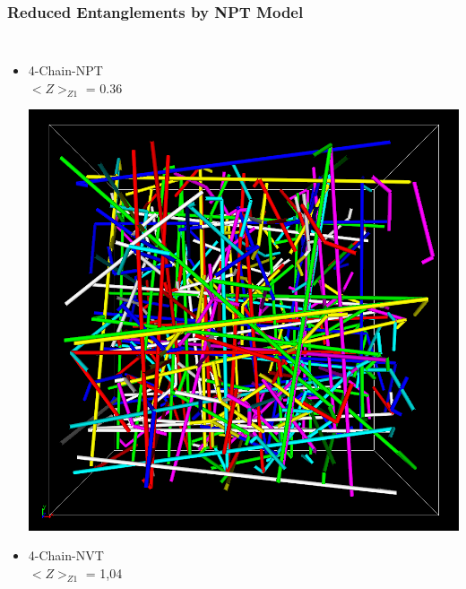 \documentclass[12pt, dvipdfmx]{beamer}
\begin{document}
\begin{frame}
    \frametitle{Reduced Entanglements by NPT Model}
		\begin{columns}[c, onlytextwidth]
                \footnotesize
				\begin{itemize}
					\item 4-Chain-\alert{NPT}\\
					$<Z>_{Z1}$ = 0.36

					\includegraphics[width=.62\textwidth]{z_cord_NPT_4Chain.png}
					\item 4-Chain-NVT\\
					$<Z>_{Z1}$ = 1,04


\end{itemize}
\end{columns}
\end{frame}
\end{document}
